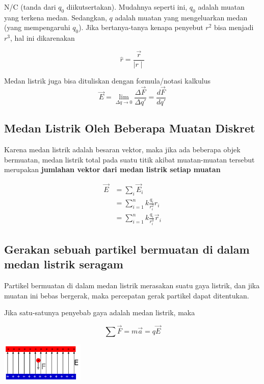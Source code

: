 \documentclass[twocolumn, 11pt]{article}%
\begin{document}
        N/C (tanda dari $q_0$ diikutsertakan). Mudahnya seperti ini, $q_0$ adalah muatan yang terkena medan. Sedangkan, $q$ adalah muatan yang mengeluarkan medan (yang mempengaruhi $q_0$).
        Jika bertanya-tanya kenapa penyebut $r^2$ bisa menjadi $r^3$, hal ini dikarenakan

        \[ \hat r = \frac{\vec r}{\mid r \mid} \]

        Medan listrik juga bisa dituliskan dengan formula/notasi kalkulus
        \[ \vec E = \lim_{\Delta q \to 0} \frac{\Delta \vec F}{\Delta q'} = \frac{d \vec F}{dq'} \]

    \subsection{Medan Listrik Oleh Beberapa Muatan Diskret}
        Karena medan listrik adalah besaran vektor, maka jika ada beberapa objek bermuatan, medan listrik total pada suatu titik akibat muatan-muatan tersebut merupakan \textbf{jumlahan vektor dari medan listrik setiap muatan}

        \begin{equation*}
            \begin{split}
                \vec E &= \sum_i \vec E_i\\
                &= \sum^n_{i=1} k \frac{q_i}{r_i^2} \hat r_i\\
                &= \sum^n_{i=1} k \frac{q_i}{r_i^3} \vec r_i
            \end{split}
        \end{equation*}

    \subsection{Gerakan sebuah partikel bermuatan di dalam medan listrik seragam}
        Partikel bermuatan di dalam medan listrik merasakan suatu gaya listrik, dan jika muatan ini bebas bergerak, maka percepatan gerak partikel dapat ditentukan.

        Jika satu-satunya penyebab gaya adalah medan listrik, maka

        \[\sum \vec F = m \vec a = q \vec E \]

        \begin{center}
        \includegraphics[width=150px]{5.png}
        \end{center}
\end{document}
